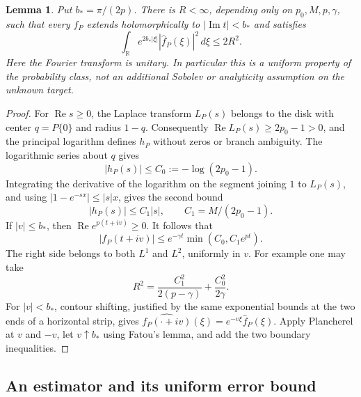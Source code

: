 \documentclass[11pt,letterpaper]{article}
\newtheorem{lemma}[theorem]{Lemma}
\theoremstyle{definition}
\theoremstyle{remark}
\newcommand{\1}{\mathbf 1}
\begin{document}
\begin{lemma}\label{p07:lem:window-analytic}
Put $b_*=\pi/(2p)$. There is $R<\infty$, depending only on
$p_0,M,p,\gamma$, such that every $f_P$ extends holomorphically to
$|\operatorname{Im}t|<b_*$ and satisfies
\begin{equation}\label{p07:eq:window-analytic-bound}
 \int_{\mathbb R}e^{2b_*|\xi|}|\widehat f_P(\xi)|^2\,d\xi
 \le 2R^2.
\end{equation}
Here the Fourier transform is unitary.  In particular this is a
uniform property of the probability class, not an additional Sobolev
or analyticity assumption on the unknown target.
\end{lemma}
\begin{proof}
For $\operatorname{Re}s\ge0$, the Laplace transform $L_P(s)$ belongs
to the disk with center $q=P\{0\}$ and radius $1-q$.
Consequently $\operatorname{Re}L_P(s)\ge2p_0-1>0$, and the principal
logarithm defines $h_P$ without zeros or branch ambiguity.  The
logarithmic series about $q$ gives
\[
 |h_P(s)|\le C_0:=-\log(2p_0-1).
\]
Integrating the derivative of the logarithm on the segment joining
$1$ to $L_P(s)$, and using
$|1-e^{-sx}|\le |s|x$, gives the second bound
\[
 |h_P(s)|\le C_1|s|,\qquad C_1=M/(2p_0-1).
\]
If $|v|\le b_*$, then $\operatorname{Re}e^{p(t+iv)}\ge0$.
It follows that
\[
 |f_P(t+iv)|\le e^{-\gamma t}
                         \min(C_0,C_1e^{pt}).
\]
The right side belongs to both $L^1$ and $L^2$, uniformly in $v$.
For example one may take
\[
 R^2=\frac{C_1^2}{2(p-\gamma)}+
                         \frac{C_0^2}{2\gamma}.
\]
For $|v|<b_*$, contour shifting, justified by the same exponential
bounds at the two ends of a horizontal strip, gives
$\widehat{f_P(\cdot+iv)}(\xi)=e^{-v\xi}\widehat f_P(\xi)$.
Apply Plancherel at $v$ and $-v$, let $v\uparrow b_*$ using
Fatou's lemma, and add the two boundary inequalities.
\end{proof}

\subsection{An estimator and its uniform error bound}
\end{document}
